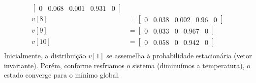 \documentclass[12pt]{article}
\newenvironment{exercise}[2][Exercício]{\begin{trivlist}
\item[\hskip \labelsep {\bfseries #1}\hskip \labelsep {\bfseries #2.}]}{\end{trivlist}}
\begin{document}
\begin{exercise}{2.e}
\begin{align*}
\begin{bmatrix}
0 & 0.068 & 0.001 & 0.931 & 0
\end{bmatrix} \\
v[8] &= \begin{bmatrix}
0 & 0.038 & 0.002 & 0.96 & 0
\end{bmatrix} \\
v[9] &= \begin{bmatrix}
0 & 0.033 & 0 & 0.967 & 0
\end{bmatrix} \\
v[10] &= \begin{bmatrix}
0 & 0.058 & 0 & 0.942 & 0
\end{bmatrix} \\
\end{align*}
Inicialmente, a distribuição $v[1]$ se assemelha à probabilidade estacionária
(vetor invariante). Porém, conforme resfriamos o sistema (diminuímos a
temperatura), o estado converge para o mínimo global.
\end{exercise}
\end{document}
